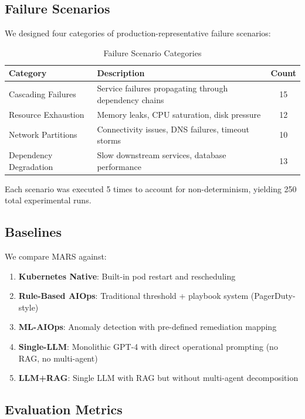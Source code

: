 \documentclass[journal]{IEEEtran}
\begin{document}
\subsection{Failure Scenarios}

We designed four categories of production-representative failure scenarios:

\begin{table}[t]
\centering
\caption{Failure Scenario Categories}
\label{tab:scenarios}
\begin{tabular}{@{}lp{4.2cm}c@{}}
\toprule
\textbf{Category} & \textbf{Description} & \textbf{Count} \\
\midrule
Cascading Failures & Service failures propagating through dependency chains & 15 \\
Resource Exhaustion & Memory leaks, CPU saturation, disk pressure & 12 \\
Network Partitions & Connectivity issues, DNS failures, timeout storms & 10 \\
Dependency Degradation & Slow downstream services, database performance & 13 \\
\bottomrule
\end{tabular}
\end{table}

Each scenario was executed 5 times to account for non-determinism, yielding 250 total experimental runs.

\subsection{Baselines}

We compare MARS against:
\begin{enumerate}
    \item \textbf{Kubernetes Native}: Built-in pod restart and rescheduling
    \item \textbf{Rule-Based AIOps}: Traditional threshold + playbook system (PagerDuty-style)
    \item \textbf{ML-AIOps}: Anomaly detection with pre-defined remediation mapping
    \item \textbf{Single-LLM}: Monolithic GPT-4 with direct operational prompting (no RAG, no multi-agent)
    \item \textbf{LLM+RAG}: Single LLM with RAG but without multi-agent decomposition
\end{enumerate}

\subsection{Evaluation Metrics}
\end{document}
